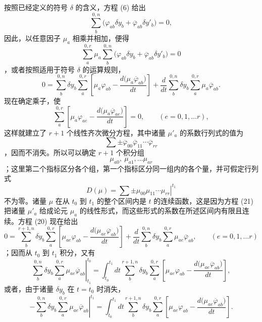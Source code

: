 \documentclass[11pt,a4paper,leqno]{article}
\begin{document}
按照已经定义的符号 $\delta$ 的含义，方程 (6) 给出
\[
\sum_b^{0,n}\bigl(\varphi_{ab}\delta y_b+\overline{\varphi}_{ab}\delta y'_b\bigr)=0,
\]
因此，以任意因子 $\mu_a$ 相乘并相加，便得
\[
\sum_a^{0,r}\mu_a\sum_b^{0,n}
\bigl(\varphi_{ab}\delta y_b+\overline{\varphi}_{ab}\delta y'_b\bigr)=0
\]
，或者按照适用于符号 $\delta$ 的运算规则，
\begin{equation}\tag{20}
0=
\sum_b^{0,n}\delta y_b\sum_a^{0,r}
\left[
\mu_a\varphi_{ab}-\frac{d\bigl(\mu_a\overline{\varphi}_{ab}\bigr)}{dt}
\right]
+\frac{d}{dt}\sum_b^{0,n}\delta y_b\sum_a^{0,r}
\mu_a\overline{\varphi}_{ab}.
\end{equation}
现在确定乘子，使
\begin{equation}\tag{21}
\sum_a^{0,r}
\left[
\mu_a\varphi_{ae}-\frac{d\bigl(\mu_a\overline{\varphi}_{ae}\bigr)}{dt}
\right]=0,
\qquad(e=0,1,\ldots r),
\end{equation}
这样就建立了 $r+1$ 个线性齐次微分方程，其中诸量 $\mu'_a$ 的系数行列式的值为
\[
\sum\mathord{\pm}\overline{\varphi}_{00}\overline{\varphi}_{11}\cdots
\overline{\varphi}_{rr}
\]
，因而不消失。所以可以确定 $r+1$ 个积分组
\begin{equation}\tag{22}
\mu_{a0},\ \mu_{a1},\ldots\mu_{ar}
\end{equation}
；这里第二个指标区分各个组，第一个指标区分同一组内的各个量，并可假定行列式
\[
D(\mu)=
\left.\sum\mathord{\pm}\mu_{00}\mu_{11}\cdots\mu_{rr}\right|^{t_1}
\]
不为零。诸量 $\mu$ 在从 $t_0$ 到 $t_1$ 的整个区间内是 $t$ 的连续函数，这是因为方程 (21) 把诸量 $\mu'_a$ 给成论元 $\mu_a$ 的线性形式，而这些形式的系数在所述区间内有限且连续。方程 (20) 现在给出
\[
0=
\sum_b^{r+1,n}\delta y_b\sum_a^{0,r}
\left[
\mu_{ae}\varphi_{ab}-\frac{d\bigl(\mu_{ae}\overline{\varphi}_{ab}\bigr)}{dt}
\right]
+\frac{d}{dt}\sum_b^{0,n}\delta y_b\sum_a^{0,r}
\mu_{ae}\overline{\varphi}_{ab},
\qquad(e=0,1,\ldots r)
\]
；因而从 $t_0$ 到 $t_1$ 积分，又有
\[
\left.
\sum_b^{0,n}\delta y_b\sum_a^{0,r}\mu_{ae}\overline{\varphi}_{ab}
\right|_{t_1}^{t_0}
=
\int_{t_0}^{t_1}dt\sum_b^{r+1,n}\delta y_b\sum_a^{0,r}
\left[
\mu_{ae}\varphi_{ab}-\frac{d\bigl(\mu_{ae}\overline{\varphi}_{ab}\bigr)}{dt}
\right],
\]
或者，由于诸量 $\delta y_b$ 在 $t=t_0$ 时消失，
\begin{equation}\tag{23}
-\left.
\sum_b^{0,n}\delta y_b\sum_a^{0,r}\mu_{ae}\overline{\varphi}_{ab}
\right|^{t_1}
=
\int_{t_0}^{t_1}dt\sum_b^{r+1,n}\delta y_b\sum_a^{0,r}
\left[
\mu_{ae}\varphi_{ab}-\frac{d\bigl(\mu_{ae}\overline{\varphi}_{ab}\bigr)}{dt}
\right].
\end{equation}
\end{document}
